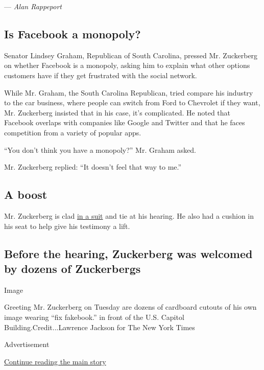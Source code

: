 --- \emph{Alan Rappeport}

\hypertarget{is-facebook-a-monopoly}{%
\subsection{Is Facebook a monopoly?}\label{is-facebook-a-monopoly}}

Senator Lindsey Graham, Republican of South Carolina, pressed Mr.
Zuckerberg on whether Facebook is a monopoly, asking him to explain what
other options customers have if they get frustrated with the social
network.

While Mr. Graham, the South Carolina Republican, tried compare his
industry to the car business, where people can switch from Ford to
Chevrolet if they want, Mr. Zuckerberg insisted that in his case, it's
complicated. He noted that Facebook overlaps with companies like Google
and Twitter and that he faces competition from a variety of popular
apps.

``You don't think you have a monopoly?'' Mr. Graham asked.

Mr. Zuckerberg replied: ``It doesn't feel that way to me.''

\hypertarget{a-boost}{%
\subsection{A boost}\label{a-boost}}

Mr. Zuckerberg is clad
\href{https://www.nytimes3xbfgragh.onion/slideshow/2018/04/10/fashion/mark-zuckerbergs-greatest-suits-appearances/s/10OTR-slide-R0LB.html}{in
a suit} and tie at his hearing. He also had a cushion in his seat to
help give his testimony a lift.

\hypertarget{before-the-hearing-zuckerberg-was-welcomed-by-dozens-of-zuckerbergs}{%
\subsection{Before the hearing, Zuckerberg was welcomed by dozens of
Zuckerbergs}\label{before-the-hearing-zuckerberg-was-welcomed-by-dozens-of-zuckerbergs}}

Image

Greeting Mr. Zuckerberg on Tuesday are dozens of cardboard cutouts of
his own image wearing ``fix fakebook.'' in front of the U.S. Capitol
Building.Credit...Lawrence Jackson for The New York Times

Advertisement

\protect\hyperlink{after-bottom}{Continue reading the main story}

